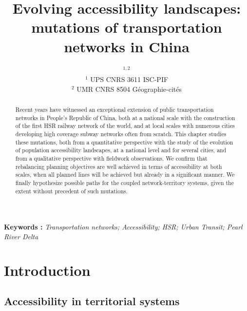 


\title{Evolving accessibility landscapes: mutations of transportation networks in China}
\author{$^{1,2}$\\
$^1$ UPS CNRS 3611 ISC-PIF\\
$^2$ UMR CNRS 8504 G{\'e}ographie-cit{\'e}s
}
\date{}


\maketitle

\justify


\begin{abstract}
Recent years have witnessed an exceptional extension of public transportation networks in People's Republic of China, both at a national scale with the construction of the first HSR railway network of the world, and at local scales with numerous cities developing high coverage subway networks often from scratch. This chapter studies these mutations, both from a quantitative perspective with the study of the evolution of population accessibility landscapes, at a national level and for several cities, and from a qualitative perspective with fieldwork observations. We confirm that rebalancing planning objectives are well achieved in terms of accessibility at both scales, when all planned lines will be achieved but already in a significant manner. We finally hypothesize possible paths for the coupled network-territory systems, given the extent without precedent of such mutations.
\end{abstract}

\textbf{Keywords : }\textit{Transportation networks; Accessibility; HSR; Urban Transit; Pearl River Delta}



\section{Introduction}

\subsection{Accessibility in territorial systems}

